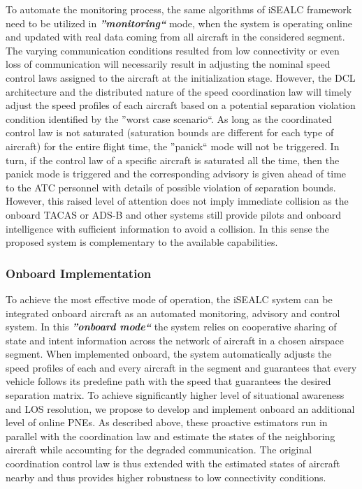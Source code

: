 \documentclass[letter,onecolumn,12pt]{aiaa-tc}
\newcommand{\1}{1_n}
\begin{document}
To automate the monitoring process, the same algorithms of iSEALC framework need to be utilized in \textbf{\emph{''monitoring``}} mode, when the system is operating online and updated with real data coming from all aircraft in the considered segment. The varying communication conditions resulted from low connectivity or even loss of communication will necessarily result in adjusting the nominal speed control laws assigned to the aircraft at the initialization stage. However, the DCL architecture and the distributed nature of the speed coordination law will timely adjust the speed profiles of each aircraft based on a potential separation violation condition identified by the ''worst case scenario``. As long as the coordinated control law is not saturated (saturation bounds are different for each type of aircraft)  for the entire flight time, the ''panick`` mode will not be triggered. In turn, if the control law of a specific aircraft is saturated all the time, then the panick mode is triggered and the corresponding advisory is given ahead of time to the ATC personnel with details of possible violation of separation bounds. However, this raised level of attention does not imply immediate collision as the onboard TACAS or ADS-B and other systems still provide pilots and onboard intelligence with sufficient information to avoid a collision. In this sense the proposed system is complementary to the available capabilities.

\subsubsection{Onboard Implementation}

To achieve the most effective mode of operation, the iSEALC system can be integrated onboard aircraft as an automated monitoring, advisory and control system. In this \textbf{\emph{''onboard mode``}} the system relies on cooperative sharing of state and intent information across the network of aircraft in a chosen airspace segment. When implemented onboard, the system automatically adjusts the speed profiles of each and every aircraft in the segment and guarantees that every vehicle follows its predefine path with the speed that guarantees the desired separation matrix. To achieve significantly higher level of situational awareness and LOS resolution, we propose to develop and implement onboard an additional level of online PNEs. As described above, these proactive estimators run in parallel with the coordination law and estimate the states of the neighboring aircraft while accounting for the degraded communication. The original coordination control law is thus extended with the estimated states of aircraft nearby and thus provides higher robustness to low connectivity conditions.
\end{document}
